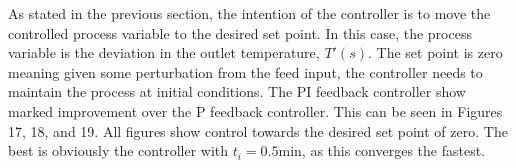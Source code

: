 \documentclass{article}
\begin{document}
As stated in the previous section, the intention of the controller is to move the controlled process variable to the desired set point. In this case, the process variable is the deviation in the outlet temperature, $T'(s)$. The set point is zero meaning given some perturbation from the feed input, the controller needs to maintain the process at initial conditions. The PI feedback controller show marked improvement over the P feedback controller. This can be seen in Figures 17, 18, and 19. All figures show control towards the desired set point of zero. The best is obviously the controller with $t_i=0.5\si{\minute}$, as this converges the fastest. 
\end{document}
